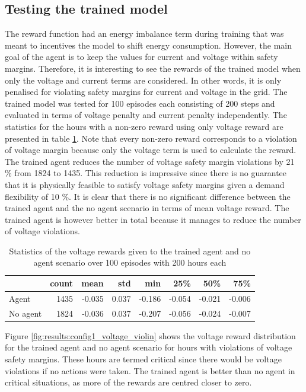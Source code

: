 \documentclass[class=book, crop=false]{standalone}
\begin{document}
\subsection{Testing the trained model}
The reward function had an energy imbalance term during training that was meant to incentives the model to shift energy consumption. However, the main goal of the agent is to keep the values for current and voltage within safety margins. Therefore, it is interesting to see the rewards of the trained model when only the voltage and current terms are considered. In other words, it is only penalised for violating safety margins for current and voltage in the grid. The trained model was tested for 100 episodes each consisting of 200 steps and evaluated
in terms of voltage penalty and current penalty independently. The statistics for the hours with a non-zero reward using only voltage reward are presented in table \ref{table:results:configuration1_reward_100_episodes}. Note that every non-zero reward corresponds to a violation of voltage margin because only the voltage term is used to calculate the reward. The trained agent reduces the number of voltage safety margin violations by 21 \% from 1824 to 1435. This reduction is impressive since there is no guarantee that it is physically feasible to satisfy voltage safety margins given a demand flexibility of 10 \%. It is clear that there is no significant difference between the trained agent and the no agent scenario in terms of mean voltage reward. The trained agent is however better in total because it manages to reduce the number of voltage violations. 
\begin{table}[ht]
\center
\begin{tabular}{l|rrrrrrr}
         & count & mean   & std   & min    & 25\%   & 50\%   & 75\%   \\
\hline
Agent    & 1435  & -0.035 & 0.037 & -0.186 & -0.054 & -0.021 & -0.006 \\
No agent & 1824  & -0.036 & 0.037 & -0.207 & -0.056 & -0.024 & -0.007 \\
\hline
\end{tabular}
\caption{Statistics of the voltage rewards given to the trained agent and no agent scenario over 100 episodes with 200 hours each}
\label{table:results:configuration1_reward_100_episodes}
\end{table}

Figure \ref{fig:results:config1_voltage_violin} shows the voltage reward distribution for the trained agent and no agent scenario for hours with violations of voltage safety margins. These hours are termed critical since there would be voltage violations if no actions were taken. The trained agent is better than no agent in critical situations, as more of the rewards are centred closer to zero.
\end{document}
